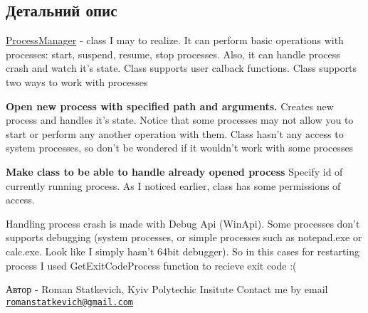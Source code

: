 \subsection{Детальний опис}
\hyperlink{class_process_manager}{Process\+Manager} -\/ class I may to realize. It can perform basic operations with processes\+: start, suspend, resume, stop processes. Also, it can handle process crash and watch it's state. Class supports user calback functions. Class supports two ways to work with processes 
\begin{DoxyItemize}
\item {\bfseries Open new process with specified path and arguments.} Creates new process and handles it's state. Notice that some processes may not allow you to start or perform any another operation with them. Class hasn't any access to system processes, so don't be wondered if it wouldn't work with some processes  
\item {\bfseries Make class to be able to handle already opened process} Specify id of currently running process. As I noticed earlier, class has some permissions of access.  
\end{DoxyItemize}Handling process crash is made with Debug Api (Win\+Api). Some processes don't supports debugging (system processes, or simple processes such as notepad.\+exe or calc.\+exe. Look like I simply hasn't 64bit debugger). So in this cases for restarting process I used Get\+Exit\+Code\+Process function to recieve exit code \+:( \begin{DoxyAuthor}{Автор}
-\/ Roman Statkevich, Kyiv Polytechic Insitute Contact me by email \href{mailto:romanstatkevich@gmail.com}{\tt romanstatkevich@gmail.\+com} 
\end{DoxyAuthor}


